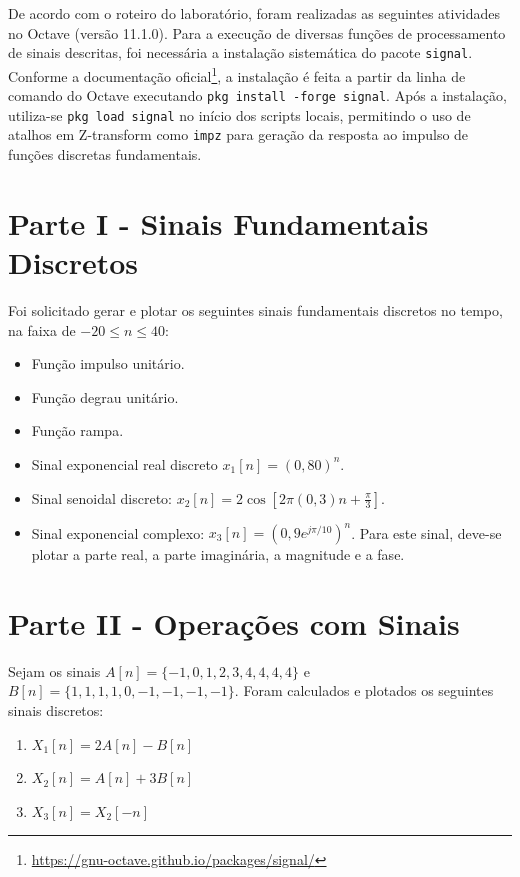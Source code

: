 \documentclass[tcc]{classe_uftex/uftex}
\begin{document}
De acordo com o roteiro do laboratório, foram realizadas as seguintes atividades no Octave (versão 11.1.0). Para a execução de diversas funções de processamento de sinais descritas, foi necessária a instalação sistemática do pacote \texttt{signal}. Conforme a documentação oficial\footnote{\url{https://gnu-octave.github.io/packages/signal/}}, a instalação é feita a partir da linha de comando do Octave executando \texttt{pkg install -forge signal}. Após a instalação, utiliza-se \texttt{pkg load signal} no início dos scripts locais, permitindo o uso de atalhos em Z-transform como \texttt{impz} para geração da resposta ao impulso de funções discretas fundamentais.

\section{Parte I - Sinais Fundamentais Discretos}
Foi solicitado gerar e plotar os seguintes sinais fundamentais discretos no tempo, na faixa de $-20 \leq n \leq 40$:
\begin{itemize}
    \item[\textbf{a)}] Função impulso unitário.
    \item[\textbf{b)}] Função degrau unitário.
    \item[\textbf{c)}] Função rampa.
    \item[\textbf{d)}] Sinal exponencial real discreto $x_{1}[n] = (0,80)^{n}$.
    \item[\textbf{e)}] Sinal senoidal discreto: $x_{2}[n] = 2\cos\left[2\pi(0,3)n + \frac{\pi}{3}\right]$.
    \item[\textbf{f)}] Sinal exponencial complexo: $x_{3}[n] = (0,9e^{j\pi/10})^{n}$. Para este sinal, deve-se plotar a parte real, a parte imaginária, a magnitude e a fase.
\end{itemize}

\section{Parte II - Operações com Sinais}
Sejam os sinais $A[n] = \{-1,0, 1, 2, 3, 4, 4, 4, 4\}$ e $B[n] = \{1,1,1,1,0,-1,-1,-1,-1\}$. Foram calculados e plotados os seguintes sinais discretos:
\begin{enumerate}
    \item[\textbf{a)}] $X_1[n] = 2A[n] - B[n]$
    \item[\textbf{b)}] $X_2[n] = A[n] + 3B[n]$
    \item[\textbf{c)}] $X_3[n] = X_2[-n]$
\end{enumerate}
\end{document}
